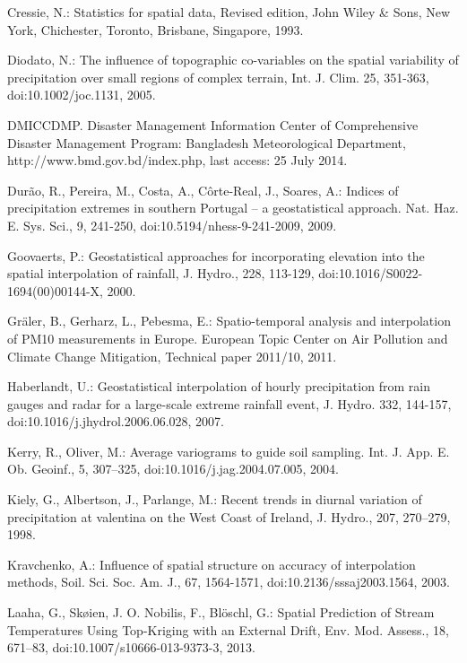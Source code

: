 \begin{thebibliography}
\bibitem{} \hangindent=1cm Cressie, N.: Statistics for spatial data, Revised edition, John Wiley & Sons, New York, Chichester, Toronto, Brisbane, Singapore, 1993.

\bibitem{} \hangindent=1cm Diodato, N.: The influence of topographic co-variables on the spatial variability of precipitation over small regions of complex terrain, Int. J. Clim. 25, 351-363, doi:10.1002/joc.1131, 2005.

\bibitem{} \hangindent=1cm DMICCDMP. Disaster Management Information Center of Comprehensive Disaster Management Program: Bangladesh Meteorological Department, http://www.bmd.gov.bd/index.php, last access: 25 July 2014.

\bibitem{} \hangindent=1cm Durão, R., Pereira, M., Costa, A., Côrte-Real, J., Soares, A.: Indices of precipitation extremes in southern Portugal – a geostatistical approach. Nat. Haz. E. Sys. Sci., 9, 241-250, doi:10.5194/nhess-9-241-2009, 2009.

\bibitem{} \hangindent=1cm Goovaerts, P.: Geostatistical approaches for incorporating elevation into the spatial interpolation of rainfall, J. Hydro., 228, 113-129, doi:10.1016/S0022-1694(00)00144-X, 2000.

\bibitem{} \hangindent=1cm Gräler, B., Gerharz, L., Pebesma, E.: Spatio-temporal analysis and interpolation of PM10 measurements in Europe. European Topic Center on Air Pollution and Climate Change Mitigation, Technical paper 2011/10, 2011.

\bibitem{} \hangindent=1cm Haberlandt, U.: Geostatistical interpolation of hourly precipitation from rain gauges and radar for a large-scale extreme rainfall event, J. Hydro. 332, 144-157, doi:10.1016/j.jhydrol.2006.06.028, 2007.

\bibitem{} \hangindent=1cm Kerry, R., Oliver, M.: Average variograms to guide soil sampling. Int. J. App. E. Ob. Geoinf., 5, 307–325, doi:10.1016/j.jag.2004.07.005, 2004.

\bibitem{} \hangindent=1cm Kiely, G., Albertson, J., Parlange, M.: Recent trends in diurnal variation of precipitation at valentina on the West Coast of Ireland, J. Hydro., 207, 270–279, 1998.

\bibitem{} \hangindent=1cm Kravchenko, A.: Influence of spatial structure on accuracy of interpolation methods, Soil. Sci. Soc. Am. J., 67, 1564-1571, doi:10.2136/sssaj2003.1564, 2003.

\bibitem{} \hangindent=1cm Laaha, G., Skøien, J. O. Nobilis, F., Blöschl, G.: Spatial Prediction of Stream Temperatures Using Top-Kriging with an External Drift, Env. Mod. Assess., 18, 671–83, doi:10.1007/s10666-013-9373-3, 2013.


\end{thebibliography}
